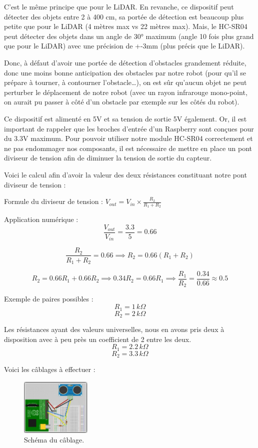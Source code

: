 \documentclass[a4paper,12pt]{report}  %
\begin{document}
C’est le même principe que pour le LiDAR. 
En revanche, ce dispositif peut détecter des objets entre 2 à 400 cm, sa portée de détection est beaucoup plus petite que pour le LiDAR (4 mètres max vs 22 mètres max). Mais, le HC-SR04 peut détecter des objets dans un angle de 30° maximum (angle 10 fois plus grand que pour le LiDAR) avec une précision de +-3mm (plus précis que le LiDAR).

Donc, à défaut d’avoir une portée de détection d’obstacles grandement réduite, donc une moins bonne anticipation des obstacles par notre robot (pour qu’il se prépare à tourner, à contourner l’obstacle…), on est sûr qu’aucun objet ne peut perturber le déplacement de notre robot (avec un rayon infrarouge mono-point, on aurait pu passer à côté d’un obstacle par exemple sur les côtés du robot).

Ce dispositif est alimenté en 5V et sa tension de sortie 5V également. Or, il est important de rappeler que les broches d’entrée d’un Raspberry sont conçues pour du 3.3V maximum. Pour pouvoir utiliser notre module HC-SR04 correctement et ne pas endommager nos composants, il est nécessaire de mettre en place un pont diviseur de tension afin de diminuer la tension de sortie du capteur.


Voici le calcul afin d’avoir la valeur des deux résistances constituant notre pont diviseur de tension : 

Formule du diviseur de tension : $V_{out} = V_{in} \times \frac{R_2}{R_1 + R_2}$

Application numérique : $$\frac{V_{out}}{V_{in}} = \frac{3.3}{5} = 0.66$$

$$\frac{R_2}{R_1 + R_2} = 0.66 \implies R_2 = 0.66 (R_1 + R_2)$$

$$R_2 = 0.66 R_1 + 0.66 R_2 \implies 0.34 R_2 = 0.66 R_1 \implies \frac{R_1}{R_2} = \frac{0.34}{0.66} \approx 0.5$$


Exemple de paires possibles : 
$$R_1 = 1 \, k\Omega$$
$$R_2 = 2 \, k\Omega$$

Les résistances ayant des valeurs universelles, 
nous en avons pris deux à disposition avec à peu près un coefficient de 2 entre les deux.
$$R_1 = 2.2 \, k\Omega$$
$$R_2 = 3.3 \, k\Omega$$

Voici les câblages à effectuer :

\begin{figure}[H]
	\centering
	\includegraphics[width=0.3\textwidth]{./attachments/capteur_ultrason_rpi.jpg}
	\caption{Schéma du câblage.}
\end{figure}
\end{document}
